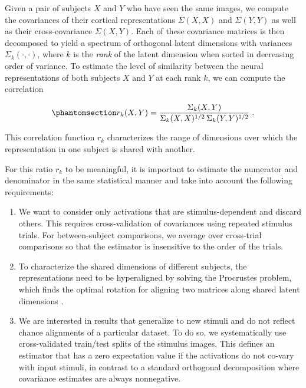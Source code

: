 \documentclass[10pt]{article}
\begin{document}
Given a pair of subjects \(X\) and \(Y\) who have seen the same images, we compute the covariances of their cortical representations \(\Sigma(X, X)\) and \(\Sigma(Y, Y)\) as well as their cross-covariance \(\Sigma(X, Y)\). Each of these covariance matrices is then decomposed to yield a spectrum of orthogonal latent dimensions with variances \(\Sigma_k(\cdot, \cdot)\), where \(k\) is the \emph{rank} of the latent dimension when sorted in decreasing order of variance. To estimate the level of similarity between the neural representations of both subjects \(X\) and \(Y\) at each rank \(k\), we can compute the correlation

\begin{equation}\phantomsection\label{eq:correlation-coefficient}{
        r_k(X, Y) = \frac{\Sigma_k(X, Y)}{\Sigma_k(X, X)^{1/2}\, \Sigma_k(Y, Y)^{1/2}}\;.
    }\end{equation}

This correlation function \(r_k\) characterizes the range of dimensions over which the representation in one subject is shared with another.

For this ratio \(r_k\) to be meaningful, it is important to estimate the numerator and denominator in the same statistical manner and take into account the following requirements:

\begin{enumerate}
    \def\labelenumi{\arabic{enumi}.}
    \tightlist
    \item
          We want to consider only activations that are stimulus-dependent and discard others. This requires cross-validation of covariances using repeated stimulus trials. For between-subject comparisons, we average over cross-trial comparisons so that the estimator is insensitive to the order of the trials.
    \item
          To characterize the shared dimensions of different subjects, the representations need to be hyperaligned by solving the Procrustes problem, which finds the optimal rotation for aligning two matrices along shared latent dimensions \autocite{Haxby2011}.
    \item
          We are interested in results that generalize to new stimuli and do not reflect chance alignments of a particular dataset. To do so, we systematically use cross-validated train/test splits of the stimulus images. This defines an estimator that has a zero expectation value if the activations do not co-vary with input stimuli, in contrast to a standard orthogonal decomposition where covariance estimates are always nonnegative.
\end{enumerate}
\end{document}
